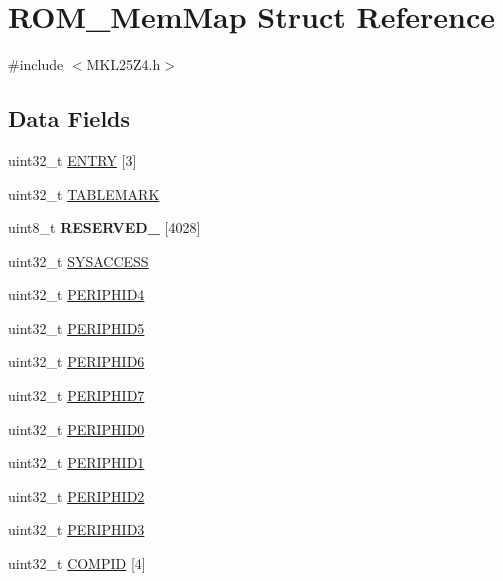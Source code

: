 \hypertarget{struct_r_o_m___mem_map}{}\section{R\+O\+M\+\_\+\+Mem\+Map Struct Reference}
\label{struct_r_o_m___mem_map}


{\ttfamily \#include $<$M\+K\+L25\+Z4.\+h$>$}

\subsection*{Data Fields}
\begin{DoxyCompactItemize}
\item 
uint32\+\_\+t \hyperlink{struct_r_o_m___mem_map_ae744813808d96459e3920bade61dcc96}{E\+N\+T\+RY} \mbox{[}3\mbox{]}
\item 
uint32\+\_\+t \hyperlink{struct_r_o_m___mem_map_a663e5f468cf810e6f1d672690b63b141}{T\+A\+B\+L\+E\+M\+A\+RK}
\item 
\mbox{\label{struct_r_o_m___mem_map_a086169a392fc8eedf1d3a111b034fa69}} 
uint8\+\_\+t {\bfseries R\+E\+S\+E\+R\+V\+E\+D\+\_} \mbox{[}4028\mbox{]}
\item 
uint32\+\_\+t \hyperlink{struct_r_o_m___mem_map_a08aba21ee3870b9eea15463bf46411a4}{S\+Y\+S\+A\+C\+C\+E\+SS}
\item 
uint32\+\_\+t \hyperlink{struct_r_o_m___mem_map_a77e302caa85d43fc41bb379c67bb2d29}{P\+E\+R\+I\+P\+H\+I\+D4}
\item 
uint32\+\_\+t \hyperlink{struct_r_o_m___mem_map_a136c3c65e70983bdce4538ed35668d26}{P\+E\+R\+I\+P\+H\+I\+D5}
\item 
uint32\+\_\+t \hyperlink{struct_r_o_m___mem_map_a649df8358a45f63eb1c5322beee352f7}{P\+E\+R\+I\+P\+H\+I\+D6}
\item 
uint32\+\_\+t \hyperlink{struct_r_o_m___mem_map_af744edcf30aecea70b419fce22ee5299}{P\+E\+R\+I\+P\+H\+I\+D7}
\item 
uint32\+\_\+t \hyperlink{struct_r_o_m___mem_map_ace4dd72e12e50c9ae1e3af145ed542ba}{P\+E\+R\+I\+P\+H\+I\+D0}
\item 
uint32\+\_\+t \hyperlink{struct_r_o_m___mem_map_ac2959cf5e34f358ff003caebf035e051}{P\+E\+R\+I\+P\+H\+I\+D1}
\item 
uint32\+\_\+t \hyperlink{struct_r_o_m___mem_map_a9fa6ff1f979408d3135dd17dbef20050}{P\+E\+R\+I\+P\+H\+I\+D2}
\item 
uint32\+\_\+t \hyperlink{struct_r_o_m___mem_map_a760f0f060bb682064909ba3c577f7e80}{P\+E\+R\+I\+P\+H\+I\+D3}
\item 
uint32\+\_\+t \hyperlink{struct_r_o_m___mem_map_a767dbeb1dc65d81e85c679c91268f2d0}{C\+O\+M\+P\+ID} \mbox{[}4\mbox{]}
\end{DoxyCompactItemize}



